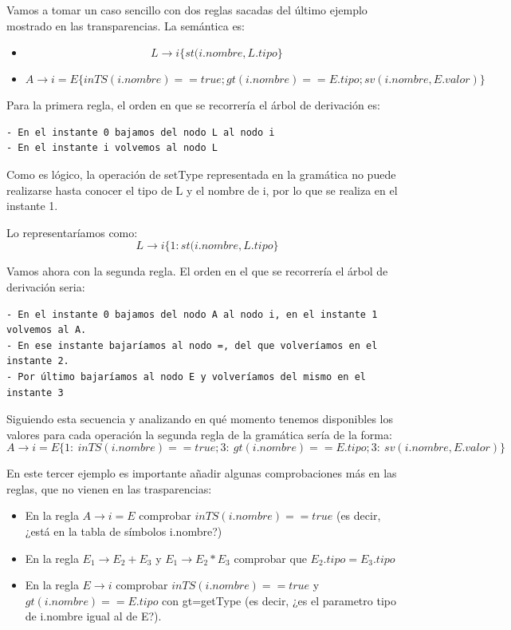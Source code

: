 \documentclass{apuntes}
\begin{document}
\begin{example}
Vamos a tomar un caso sencillo con dos reglas sacadas del último ejemplo mostrado en las transparencias. La semántica es:
\begin{itemize}
\item \[L \rightarrow i \{st(i.nombre,L.tipo\}\]
\item \[A \rightarrow i = E \{in TS (i.nombre)==true; gt(i.nombre)==E.tipo; sv(i.nombre, E.valor)\}\]
\end{itemize}

Para la primera regla, el orden en que se recorrería el árbol de derivación es:
\begin{verbatim}
- En el instante 0 bajamos del nodo L al nodo i
- En el instante i volvemos al nodo L
\end{verbatim}

Como es lógico, la operación de setType representada en la gramática no puede realizarse hasta conocer el tipo de L y el nombre de i, por lo que se realiza en el instante 1.

Lo representaríamos como:
\[L \rightarrow i \{1:st(i.nombre,L.tipo\}\]

Vamos ahora con la segunda regla. El orden en el que se recorrería el árbol de derivación seria:
\begin{verbatim}
- En el instante 0 bajamos del nodo A al nodo i, en el instante 1 volvemos al A.
- En ese instante bajaríamos al nodo =, del que volveríamos en el instante 2.
- Por último bajaríamos al nodo E y volveríamos del mismo en el instante 3
\end{verbatim}

Siguiendo esta secuencia y analizando en qué momento tenemos disponibles los valores para cada operación la segunda regla de la gramática sería de la forma:
\[A \rightarrow i = E \{ 1: \ in TS (i.nombre)==true; 3: \ gt(i.nombre)==E.tipo; 3: \ sv(i.nombre, E.valor)\}\]

En este tercer ejemplo es importante añadir algunas comprobaciones más en las reglas, que no vienen en las trasparencias:
\begin{itemize}
\item En la regla $A \rightarrow i=E$ comprobar $inTS(i.nombre)==true$ (es decir, ¿está en la tabla de símbolos i.nombre?)

\item En la regla $E_1 \rightarrow E_2 + E_3$ y $E_1 \rightarrow E_2 * E_3$ comprobar que $E_2.tipo=E_3.tipo$

\item En la regla $E \rightarrow i$ comprobar $inTS(i.nombre)==true$ y $gt(i.nombre)==E.tipo$ con gt=getType (es decir, ¿es el parametro tipo de i.nombre igual al de E?).
\end{itemize}
\end{example}
\end{document}
